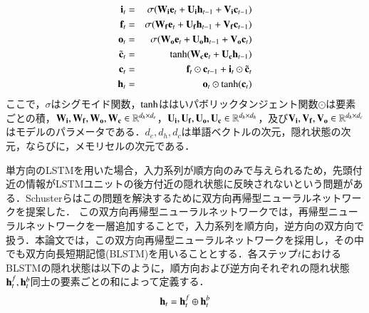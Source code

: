 \documentclass[dvipdfmx,twocolumn,10.5pt]{jsarticle}
\begin{document}
\begin{eqnarray}
{\bf i}_t&=&\sigma ({\bf W}_{\bf i} {\bf e}_t + {\bf U}_{\bf i}{\bf h}_{t-1} + {\bf V}_{\bf i}{\bf c}_{t-1}) \\
{\bf f}_t&=&\sigma ({\bf W}_{\bf f} {\bf e}_t + {\bf U}_{\bf f}{\bf h}_{t-1} + {\bf V}_{\bf f}{\bf c}_{t-1}) \\
{\bf o}_t&=& \sigma ({\bf W}_{\bf o} {\bf e}_t + {\bf U}_{\bf o}{\bf h}_{t-1} + {\bf V}_{\bf o}{\bf c}_{t}) \\
\tilde{{\bf c}}_t &=& {\rm tanh}({\bf W}_{\bf c} {\bf e}_t + {\bf U}_{\bf c}{\bf h}_{t-1}) \\
{\bf c}_t &=& {\bf f}_t \odot {\bf c}_{t-1} + {\bf i}_t \odot \tilde{{\bf c}}_t \\
{\bf h}_t &=& {\bf o}_t \odot {\rm tanh}({\bf c}_t) 
\end{eqnarray}
ここで，$\sigma$はシグモイド関数，${\rm tanh}$ははいパボリックタンジェント関数$\odot$は要素ごとの積，${\bf W}_{\bf i}, {\bf W}_{\bf f}, {\bf W}_{\bf o}, {\bf W}_{\bf c} \in \mathbb{R}^{d_h\times d_e} $，${\bf U}_{\bf i}, {\bf U}_{\bf f}, {\bf U}_{\bf o}, {\bf U}_{\bf c} \in \mathbb{R}^{d_h\times d_h} $，及び${\bf V}_{\bf i}, {\bf V}_{\bf f}, {\bf V}_{\bf o} \in \mathbb{R}^{d_h\times d_c} $ はモデルのパラメータである．$d_e, d_h, d_c$は単語ベクトルの次元，隠れ状態の次元，ならびに，メモリセルの次元である．

単方向のLSTMを用いた場合，入力系列が順方向のみで与えられるため，先頭付近の情報がLSTMユニットの後方付近の隠れ状態に反映されないという問題がある．Schusterらはこの問題を解決するために双方向再帰型ニューラルネットワークを提案した．\cite{schuster1997bidirectional}
この双方向再帰型ニューラルネットワークでは，再帰型ニューラルネットワークを一層追加することで，入力系列を順方向，逆方向の双方向で扱う．本論文では，この双方向再帰型ニューラルネットワークを採用し，その中でも双方向長短期記憶(BLSTM)を用いることとする．各ステップ$t$におけるBLSTMの隠れ状態は以下のように，順方向および逆方向それぞれの隠れ状態${\bf h}_t^f, {\bf h}_t^b$同士の要素ごとの和によって定義する．
\begin{equation}
  {\bf h}_t = {\bf h}_t^f \oplus  {\bf h}_t^b
\end{equation}
\end{document}
